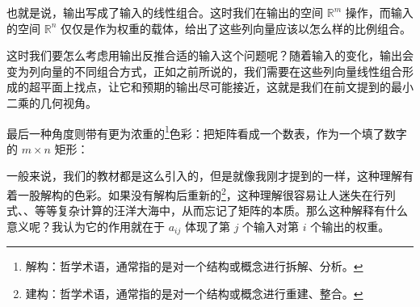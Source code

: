 也就是说，输出写成了输入的线性组合。这时我们在输出的空间 $\mathbb{R}^m$ 操作，而输入的空间 $\mathbb{R}^n$ 仅仅是作为权重的载体，给出了这些列向量应该以怎么样的比例组合。

这时我们要怎么考虑用输出反推合适的输入这个问题呢？随着输入的变化，输出会变为列向量的不同组合方式，正如之前所说的，我们需要在这些列向量线性组合形成的超平面上找点，让它和预期的输出尽可能接近，这就是我们在前文提到的最小二乘的几何视角。

最后一种角度则带有更为浓重的\footnote{解构：哲学术语，通常指的是对一个结构或概念进行拆解、分析。}色彩：把矩阵看成一个数表，作为一个填了数字的 $m\times n$ 矩形：
\begin{figure}[H]
    \centering
\end{figure}

一般来说，我们的教材都是这么引入的，但是就像我刚才提到的一样，这种理解有着一股解构的色彩。如果没有解构后重新的\footnote{建构：哲学术语，通常指的是对一个结构或概念进行重建、整合。}，这种理解很容易让人迷失在行列式、、等等复杂计算的汪洋大海中，从而忘记了矩阵的本质。那么这种解释有什么意义呢？我认为它的作用就在于 $a_{ij}$ 体现了第 $j$ 个输入对第 $i$ 个输出的权重。

